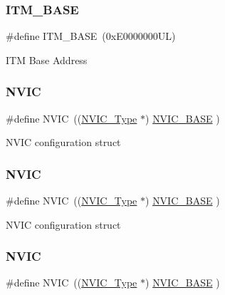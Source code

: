 \subsubsection{\texorpdfstring{I\+T\+M\+\_\+\+B\+A\+SE}{ITM\_BASE}\hspace{0.1cm}{\footnotesize\ttfamily [6/6]}}
{\footnotesize\ttfamily \#define I\+T\+M\+\_\+\+B\+A\+SE~(0x\+E0000000\+U\+L)}

I\+TM Base Address \mbox{\label{group___c_m_s_i_s__core__base_gac8e97e8ce56ae9f57da1363a937f8a17}} 
\subsubsection{\texorpdfstring{N\+V\+IC}{NVIC}\hspace{0.1cm}{\footnotesize\ttfamily [1/12]}}
{\footnotesize\ttfamily \#define N\+V\+IC~((\hyperlink{struct_n_v_i_c___type}{N\+V\+I\+C\+\_\+\+Type}      $\ast$)     \hyperlink{group___c_m_s_i_s__core__base_gaa0288691785a5f868238e0468b39523d}{N\+V\+I\+C\+\_\+\+B\+A\+SE}     )}

N\+V\+IC configuration struct \mbox{\label{group___c_m_s_i_s__core__base_gac8e97e8ce56ae9f57da1363a937f8a17}} 
\subsubsection{\texorpdfstring{N\+V\+IC}{NVIC}\hspace{0.1cm}{\footnotesize\ttfamily [2/12]}}
{\footnotesize\ttfamily \#define N\+V\+IC~((\hyperlink{struct_n_v_i_c___type}{N\+V\+I\+C\+\_\+\+Type}      $\ast$)     \hyperlink{group___c_m_s_i_s__core__base_gaa0288691785a5f868238e0468b39523d}{N\+V\+I\+C\+\_\+\+B\+A\+SE}     )}

N\+V\+IC configuration struct \mbox{\label{group___c_m_s_i_s__core__base_gac8e97e8ce56ae9f57da1363a937f8a17}} 
\subsubsection{\texorpdfstring{N\+V\+IC}{NVIC}\hspace{0.1cm}{\footnotesize\ttfamily [3/12]}}
{\footnotesize\ttfamily \#define N\+V\+IC~((\hyperlink{struct_n_v_i_c___type}{N\+V\+I\+C\+\_\+\+Type}      $\ast$)     \hyperlink{group___c_m_s_i_s__core__base_gaa0288691785a5f868238e0468b39523d}{N\+V\+I\+C\+\_\+\+B\+A\+SE}     )}

